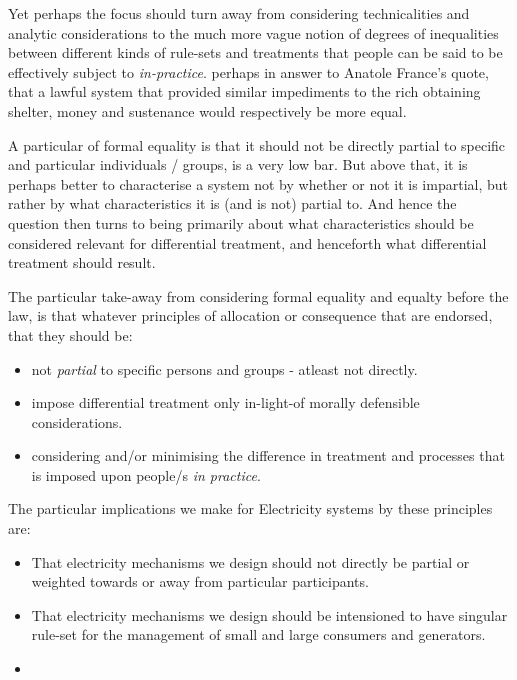 Yet perhaps the focus should turn away from considering technicalities and analytic considerations to the much more vague notion of degrees of inequalities between different kinds of rule-sets and treatments that people can be said to be effectively subject to \textit{in-practice}.
perhaps in answer to Anatole France's quote, that a lawful system that provided similar impediments to the rich obtaining shelter, money and sustenance would respectively be more equal.


A particular of formal equality is that it should not be directly partial to specific and particular individuals / groups, is a very low bar. But above that, it is perhaps better to characterise a system not by whether or not it is impartial, but rather by what characteristics it is (and is not) partial to.
And hence the question then turns to being primarily about what characteristics should be considered relevant for differential treatment, and henceforth what differential treatment should result.

The particular take-away from considering formal equality and equalty before the law, is that whatever principles of allocation or consequence that are endorsed, that they should be:
\begin{itemize}
    \item not \textit{partial} to specific persons and groups - atleast not directly.
    \item impose differential treatment only in-light-of morally defensible considerations.
    \item considering and/or minimising the difference in treatment and processes that is imposed upon people/s \textit{in practice}.
\end{itemize}

The particular implications we make for Electricity systems by these principles are:
\begin{itemize}
    \item That electricity mechanisms we design should not directly be partial or weighted towards or away from particular participants.
    \item That electricity mechanisms we design should be intensioned to have singular rule-set for the management of small and large consumers and generators.
    \item 
\end{itemize}

